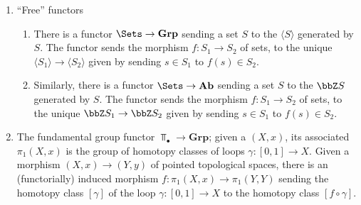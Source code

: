 \begin{example}
\begin{enumerate}
\begin{enumerate}
        \item The forgetful functor $F: \mathbf{Ab} \to \mathbf{Grp}$  sending an abelian group $A$ to itself, and sending a group homomorphism $A_1 \to A_2$ to itself.
        \end{enumerate}

    \item ``Free'' functors
    \begin{enumerate}
        \item There is a functor $\Sets \to \mathbf{Grp}$ sending a set $S$ to the  $\langle S \rangle$ generated by $S$. The functor sends the morphism $f:S_1 \to S_2$ of sets, to the unique  $\langle S_1 \rangle \to \langle S_2 \rangle$ given by sending $s \in S_1$ to $f(s) \in S_2$.

        \item Similarly, there is a functor $\Sets \to \mathbf{Ab}$ sending a set $S$ to the  $\bbZ S$ generated by $S$. The functor sends the morphism $f:S_1 \to S_2$ of sets, to the unique  $\bbZ S_1 \to \bbZ S_2$ given by sending $s \in S_1$ to $f(s) \in S_2$.

    \end{enumerate}

    \item The fundamental group functor $\Top_\bullet \to \mathbf{Grp}$; given a  $(X,x)$, its associated  $\pi_1(X,x)$ is the group of homotopy classes of loops $\gamma: [0,1] \to X$. Given a morphism $(X,x) \to (Y,y)$ of pointed topological spaces, there is an (functorially) induced morphism $f: \pi_1(X,x) \to \pi_1(Y,Y)$ sending the homotopy class $[\gamma]$ of the loop $\gamma: [0,1] \to X$ to the homotopy class $[f \circ \gamma]$.
    \end{enumerate}
\end{example}



